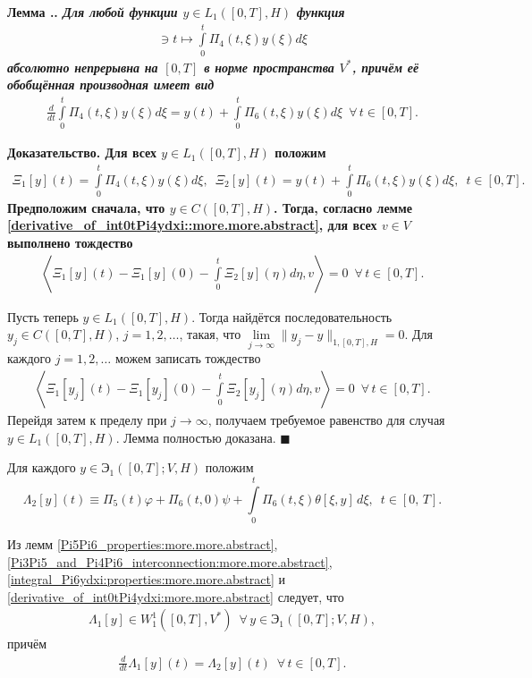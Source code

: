 \documentclass{report}
\newcounter{lem}[section]
\renewcommand{\thelem}{\thesection.\arabic{lem}}
\newenvironment{Lemma}{\par\refstepcounter{lem}\bf Лемма \thelem. \it}{\rm\par}
\newenvironment{Proof}{\par\noindent\bf Доказательство.\rm}{ $\blacksquare$\par}
\begin{document}
\begin{Lemma}\label{derivative_of_int0tPi4ydxi:more.more.abstract}
Для любой функции $y\in L_1([0,T],H)$ функция
\begin{gather*}
[0,T]\ni t\mapsto\int\limits_0^t\Pi_4(t,\xi)y(\xi)d\xi
\end{gather*}
абсолютно непрерывна на $[0,T]$ в норме пространства $V^*$, причём её обобщённая производная имеет вид
\begin{gather*}
\frac{d}{dt}\int\limits_0^t\Pi_4(t,\xi)y(\xi)d\xi=y(t)+\int\limits_0^t\Pi_6(t,\xi)y(\xi)d\xi\,\,\,\forall\,t\in[0,T].
\end{gather*}
\end{Lemma}
\begin{Proof}
Для всех $y\in L_1([0,T],H)$ положим
\begin{gather*}
\Xi_1[y](t)=\int\limits_0^t\Pi_4(t,\xi)y(\xi)d\xi,\,\,\,\Xi_2[y](t)=y(t)+\int\limits_0^t\Pi_6(t,\xi)y(\xi)d\xi,\,\,\,t\in[0,T].
\end{gather*}
Предположим сначала, что $y\in C([0,T],H)$. Тогда, согласно лемме \ref{derivative_of_int0tPi4ydxi::more.more.abstract}, для всех $v\in V$ выполнено тождество
\begin{gather*}%
\left\langle\Xi_1[y](t)-\Xi_1[y](0)-\int\limits_0^t\Xi_2[y](\eta)d\eta,v\right\rangle=0\,\,\,\forall\,t\in[0,T].
\end{gather*}

Пусть теперь $y\in L_1([0,T],H)$. Тогда найдётся последовательность $y_j\in C([0,T],H)$, $j=1,2,\dots$, такая, что $\lim\limits_{j\to\infty}\|y_j-y\|_{1,[0,T],H}=0$. Для каждого
$j=1,2,\dots$ можем записать тождество
\begin{gather*}%
\left\langle\Xi_1[y_j](t)-\Xi_1[y_j](0)-\int\limits_0^t\Xi_2[y_j](\eta)d\eta,v\right\rangle=0\,\,\,\forall\,t\in[0,T].
\end{gather*}
Перейдя затем к пределу при $j\to\infty$, получаем требуемое равенство для случая $y\in L_1([0,T],H)$. Лемма полностью доказана.
\end{Proof}

Для каждого $y\in{\textbf{Э}}_1([0,T];V,H)$ положим
\begin{equation*}
\Lambda_2[y](t)\equiv\Pi_5(t)\varphi+\Pi_6(t,0)\psi+ \int\limits_{0}^{t}\Pi_6(t,\xi)\theta[\xi,y]\,d\xi,\,\,\, t\in[0,\,T].
\end{equation*}

Из лемм \ref{Pi5Pi6_properties:more.more.abstract}, \ref{Pi3Pi5_and_Pi4Pi6_interconnection:more.more.abstract}, \ref{integral_Pi6ydxi:properties:more.more.abstract} и
\ref{derivative_of_int0tPi4ydxi:more.more.abstract} следует, что
\begin{gather*}
\Lambda_1[y]\in W^1_1([0,T],V^*)\,\,\,\forall\,y\in{\textbf{Э}}_1([0,T];V,H),
\end{gather*}
причём
\begin{gather*}
\frac{d}{dt}\Lambda_1[y](t)=\Lambda_2[y](t)\,\,\,\forall\,t\in[0,T].
\end{gather*}
\end{document}
